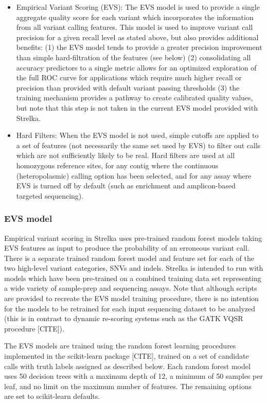 \documentclass{article}
\begin{document}
\begin{itemize}
    \item Empirical Variant Scoring (EVS):
    The EVS model is used to provide a single aggregate quality score for each variant which incorporates the information from all variant calling features. This model is used to improve variant call precision for a given recall level as stated above, but also provides additional benefits: (1) the EVS model tends to provide a greater precision improvement than simple hard-filtration of the features (see below) (2) consolidating all accuracy predictors to a single metric allows for an optimized exploration of the full ROC curve for applications which require much higher recall or precision than provided with default variant passing thresholds (3) the training mechanism provides a pathway to create calibrated quality values, but note that this step is not taken in the current EVS model provided with Strelka.
    \item Hard Filters:
    When the EVS model is not used, simple cutoffs are applied to a set of features (not necessarily the same set used by EVS) to filter out calls which are not sufficiently likely to be real. Hard filters are used at all homozygous reference sites, for any contig where the continuous (heteropolasmic) calling option has been selected, and for any assay where EVS is turned off by default (such as enrichment and amplicon-based targeted sequencing).
\end{itemize}


\subsubsection{EVS model}

Empirical variant scoring in Strelka uses pre-trained random forest models taking EVS features as input to produce the probability of an erroneous variant call. There is a separate trained random forest model and feature set for each of the two high-level variant categories, SNVs and indels. Strelka is intended to run with models which have been pre-trained on a combined training data set representing a wide variety of sample-prep and sequencing assays. Note that although scripts are provided to recreate the EVS model training procedure, there is no intention for the models to be retrained for each input sequencing dataset to be analyzed (this is in contrast to dynamic re-scoring systems such as the GATK VQSR procedure [CITE]).

The EVS models are trained using the random forest learning procedures implemented in the scikit-learn package [CITE], trained on a set of candidate calls with truth labels assigned as described below. Each random forest model uses 50 decision trees with a maximum depth of 12, a minimum of 50 samples per leaf, and no limit on the maximum number of features. The remaining options are set to scikit-learn defaults.
\end{document}
